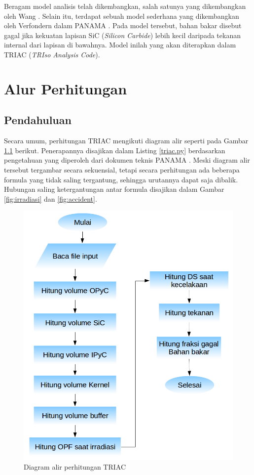 \documentclass[a4paper,11pt]{report}
\begin{document}
Beragam model analisis telah dikembangkan, salah satunya yang dikembangkan oleh Wang \cite{wang2004integrated}. Selain itu, terdapat sebuah model sederhana yang dikembangkan oleh Verfondern dalam PANAMA \cite{VERFONDERN201484}. Pada model tersebut, bahan bakar disebut gagal jika kekuatan lapisan SiC (\textit{Silicon Carbide}) lebih kecil daripada tekanan internal dari lapisan di bawahnya. Model inilah yang akan diterapkan dalam TRIAC (\textit{TRIso Analysis Code}).

\chapter{Alur Perhitungan}
\section{Pendahuluan}
Secara umum, perhitungan TRIAC mengikuti diagram alir seperti pada Gambar \ref{fig:flowchart} berikut. Penerapannya disajikan dalam Listing \ref{triac.py} berdasarkan pengetahuan yang diperoleh dari dokumen teknis PANAMA \cite{report1}. Meski diagram alir tersebut tergambar secara sekuensial, tetapi secara perhitungan ada beberapa formula yang tidak saling tergantung, sehingga urutannya dapat saja dibalik. Hubungan saling ketergantungan antar formula disajikan dalam Gambar \ref{fig:irradiasi} dan \ref{fig:accident}. 
\begin{figure}[h]
  \centering
  \includegraphics[scale=.5]{pics/Flowchart.png}
  \caption{Diagram alir perhitungan TRIAC}
  \label{fig:flowchart}
\end{figure}
\end{document}
